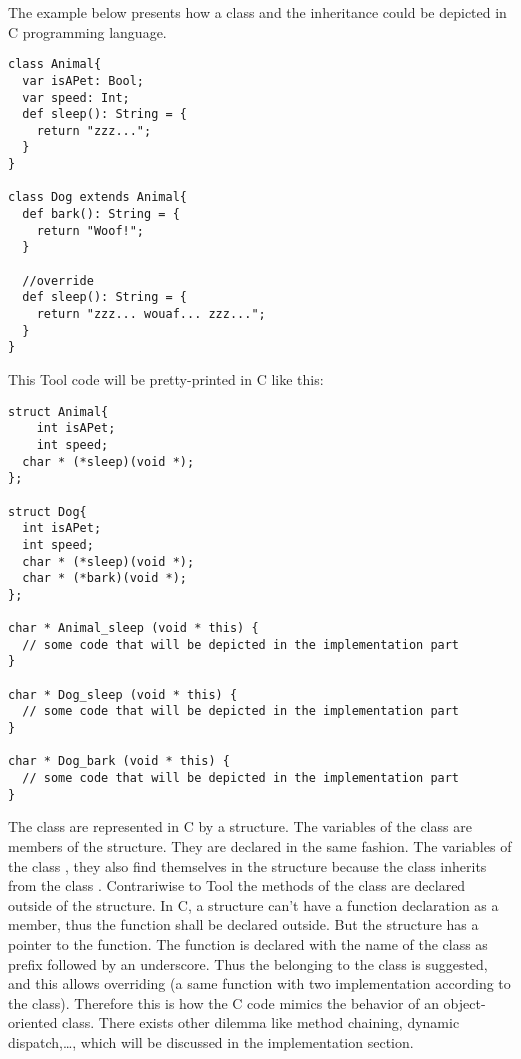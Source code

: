 The example below presents how a class and the inheritance could be depicted in C programming language.
\lstset{style=customtool}
\begin{lstlisting}
class Animal{
  var isAPet: Bool;
  var speed: Int;
  def sleep(): String = {
    return "zzz...";
  }
}

class Dog extends Animal{
  def bark(): String = {
    return "Woof!";
  }

  //override
  def sleep(): String = {
    return "zzz... wouaf... zzz...";
  }
}
\end{lstlisting}
This Tool code will be pretty-printed in C like this:
\lstset{style=customc}
\begin{lstlisting}
struct Animal{
	int isAPet;
	int speed;
  char * (*sleep)(void *);
};

struct Dog{
  int isAPet;
  int speed;
  char * (*sleep)(void *);
  char * (*bark)(void *);
};

char * Animal_sleep (void * this) {
  // some code that will be depicted in the implementation part
}

char * Dog_sleep (void * this) {
  // some code that will be depicted in the implementation part
}

char * Dog_bark (void * this) {
  // some code that will be depicted in the implementation part
}
\end{lstlisting}
The class are represented in C by a structure. The variables of the class
are members of the structure. They are declared in the same fashion.
\newline
The variables of the class , they also find themselves in the  structure
because the class  inherits from the class .
\newline
Contrariwise to Tool the methods of the class are declared outside of the structure.
In C, a structure can't have a function declaration as a member, thus the function shall
be declared outside. But the structure has a pointer to the function.
\newline
The function is declared with the name of the class as prefix followed by an underscore.
Thus the belonging to the  class is suggested, and this allows overriding (a same function with two implementation according to the class).
\newline
Therefore this is how the C code mimics the behavior of an object-oriented class.
\newline
There exists other dilemma like method chaining, dynamic dispatch,\ldots, which will be discussed
in the implementation section.
\newline
